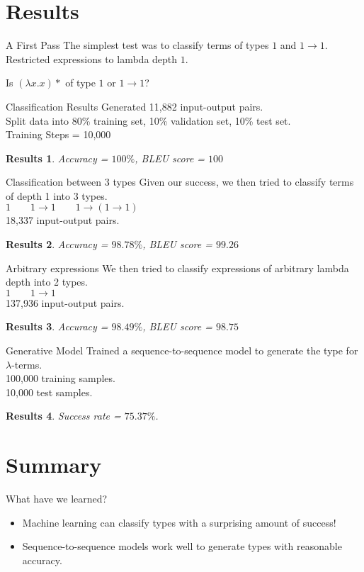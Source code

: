 \documentclass[17pt]{beamer}
\newtheorem{res}{Results}
\begin{document}
\section{Results}

\begin{frame}{A First Pass}
  The simplest test was to classify terms of types $1$ and $1 \to 1$.\\
  Restricted expressions to lambda depth $1$.

  \begin{example}
    Is $(\lambda x. x)*$ of type $1$ or $1 \to 1$?
  \end{example}
\end{frame}

\begin{frame}{Classification Results}
  Generated 11,882 input-output pairs.\\
  Split data into 80\% training set, 10\% validation set, 10\% test set.\\
  Training Steps = 10,000
  \begin{res}
  Accuracy = $100\%$, BLEU score = $100$
  \end{res}
\end{frame}

\begin{frame}{Classification between 3 types}
  Given our success, we then tried to classify terms of depth 1 into
  3 types.\\
  $1 \qquad 1 \to 1 \qquad 1 \to (1 \to 1)$\\
  18,337 input-output pairs.
  \begin{res}
  Accuracy = $98.78\%$, BLEU score = $99.26$
  \end{res}
\end{frame}

\begin{frame}{Arbitrary expressions}
  We then tried to classify expressions of arbitrary lambda depth
  into 2 types.\\
  $1 \qquad 1 \to 1$\\
  137,936 input-output pairs.
  \begin{res}
  Accuracy = $98.49\%$, BLEU score = $98.75$
  \end{res}
\end{frame}

\begin{frame}{Generative Model}
  Trained a sequence-to-sequence model to generate the type for $\lambda$-terms.\\
  100,000 training samples.\\
  10,000 test samples.
  \begin{res}
    Success rate = $75.37\%$.
  \end{res}
\end{frame}

\section{Summary}

\begin{frame}{What have we learned?}
  \begin{itemize}
  \item Machine learning can classify types with a surprising amount of
    success!
  \item Sequence-to-sequence models work well to generate types with
    reasonable accuracy.
  \end{itemize}
\end{frame}
\end{document}
